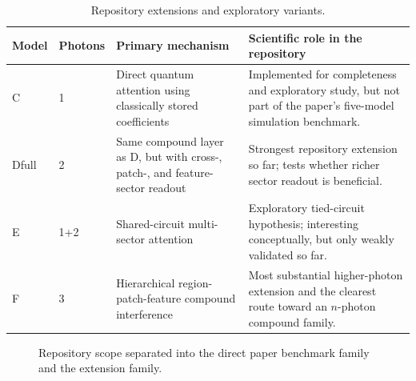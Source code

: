 \documentclass[11pt,a4paper]{article}
\def\texttt#1{#1}%
\def\_{}%
\begin{document}
\begin{table}[tbp]
\centering
\caption{Repository extensions and exploratory variants.}
\label{tab:extension-family}
\small
\begin{tabularx}{\textwidth}{L{2.8cm}L{1.5cm}L{3.8cm}Y}
\toprule
Model & Photons & Primary mechanism & Scientific role in the repository \\
\midrule
C & 1 & Direct quantum attention using classically stored coefficients & Implemented for completeness and exploratory study, but not part of the paper's five-model simulation benchmark. \\
D\_full & 2 & Same compound layer as \texttt{D}, but with cross-, patch-, and feature-sector readout & Strongest repository extension so far; tests whether richer sector readout is beneficial. \\
E & 1+2 & Shared-circuit multi-sector attention & Exploratory tied-circuit hypothesis; interesting conceptually, but only weakly validated so far. \\
F & 3 & Hierarchical region-patch-feature compound interference & Most substantial higher-photon extension and the clearest route toward an \(n\)-photon compound family. \\
\bottomrule
\end{tabularx}
\normalsize
\end{table}

\begin{figure}[tbp]
\centering
\begin{adjustbox}{max width=0.88\textwidth}
\end{adjustbox}
\caption{Repository scope separated into the direct paper benchmark family and the extension family.}
\label{fig:model-scope}
\end{figure}
\end{document}
